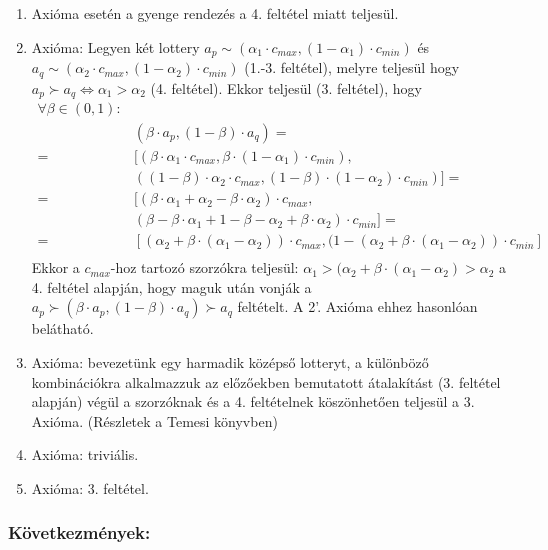 \documentclass[a4paper,12pt]{article}
\begin{document}
\begin{enumerate}
\item Axióma esetén a gyenge rendezés a 4. feltétel miatt teljesül.
\item Axióma: Legyen két lottery $a_p \sim (\alpha_1 \cdot c_{max}, (1-\alpha_1 )\cdot c_{min})$ és 
$a_q \sim (\alpha_2 \cdot c_{max}, (1-\alpha_2 )\cdot c_{min})$ (1.-3. feltétel), melyre teljesül hogy $a_p \succ a_q \Leftrightarrow \alpha_1  > \alpha_2 $ (4. feltétel). Ekkor teljesül (3. feltétel), hogy
\begin{equation}
\begin{split}
\forall \beta \in (0,1):& \\
& (\beta\cdot a_p, (1-\beta)\cdot a_q) = \\ 
= & [(\beta\cdot \alpha_1 \cdot c_{max}, \beta\cdot (1-\alpha_1 )\cdot c_{min}), \\
& ((1-\beta)\cdot \alpha_2 \cdot c_{max}, (1-\beta)\cdot (1-\alpha_2 )\cdot c_{min})] = \\
= & [(\beta\cdot \alpha_1  + \alpha_2 -\beta\cdot \alpha_2  )\cdot c_{max},\\
& (\beta-\beta\cdot \alpha_1  + 1-\beta-\alpha_2 +\beta\cdot \alpha_2 )\cdot c_{min}] = \\ 
= & [(\alpha_2  + \beta\cdot (\alpha_1  - \alpha_2  ))\cdot c_{max},(1 - (\alpha_2  + \beta\cdot (\alpha_1  - \alpha_2  ))\cdot c_{min}] \\
\end{split}
\end{equation} 
Ekkor a $c_{max}$-hoz tartozó szorzókra teljesül: $\alpha_1  >(\alpha_2  + \beta\cdot (\alpha_1  - \alpha_2 ) > \alpha_2 $ a 4. feltétel alapján, hogy maguk után vonják a $a_p \succ (\beta\cdot a_p , (1-\beta)\cdot a_q ) \succ a_q$ feltételt. A 2'. Axióma ehhez hasonlóan belátható.
\item Axióma: bevezetünk egy harmadik középső lotteryt, a különböző kombinációkra alkalmazzuk az előzőekben bemutatott átalakítást (3. feltétel alapján) végül a szorzóknak és a 4. feltételnek köszönhetően teljesül a 3. Axióma. (Részletek a Temesi könyvben) 
\item Axióma: triviális.
\item Axióma: 3. feltétel.
\end{enumerate}

\subsubsection{Következmények: }
\end{document}
